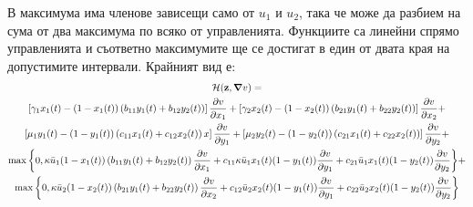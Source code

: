 В максимума има членове зависещи само от $u_1$ и $u_2$, така че може да разбием на сума от два максимума по всяко от управленията. Функциите са линейни спрямо управленията и съответно максимумите ще се достигат в един от двата края на допустимите интервали. Крайният вид е:
\begin{multline}
  \label{eq:HamiltonianShort}
  \mathcal{H}(\mathbf{z}, \grad{v}) = \\
  \left[\gamma_1 x_1(t) - (1-x_1(t)) \left(b_{11} y_1(t) + b_{12} y_2(t)\right) \right] \pdv{v}{x_1} +
  \left[\gamma_2 x_2(t) - (1-x_2(t)) \left(b_{21} y_1(t) + b_{22} y_2(t)\right) \right] \pdv{v}{x_2} + \\
  \left[\mu_1 y_1(t) - (1-y_1(t)) \left(c_{11} x_1(t) + c_{12} x_2(t)\right) x\right] \pdv{v}{y_1} +
  \left[\mu_2 y_2(t) - (1-y_2(t)) \left(c_{21} x_1(t) + c_{22} x_2(t)\right)\right] \pdv{v}{y_2} + \\
  \max\bigg\{0, \kappa \bar{u}_1 (1-x_1(t)) \left(b_{11} y_1(t) + b_{12} y_2(t)\right) \pdv{v}{x_1} + c_{11} \kappa \bar{u}_1 x_1(t) (1-y_1(t))\pdv{v}{y_1} + c_{21} \bar{u}_1 x_1(t) (1-y_2(t)) \pdv{v}{y_2}
  \bigg\} + \\
  \max\bigg\{0, \kappa \bar{u}_2 (1-x_2(t)) \left(b_{21} y_1(t) + b_{22} y_2(t)\right) \pdv{v}{x_2} + c_{12} \bar{u}_2 x_2(t) (1-y_1(t))\pdv{v}{y_1} + c_{22}  \bar{u}_2 x_2(t) (1-y_2(t))\pdv{v}{y_2} \bigg\}
\end{multline}
